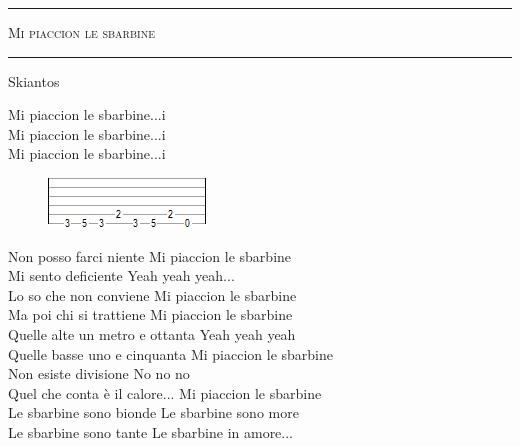 \documentclass[10pt, twoside, a4paper]{article}
\begin{document}
\begin{center}

	\hrule \vspace{0.2cm}
     	\textsc{\LARGE Mi piaccion le sbarbine}
	\vspace{0.2cm} \hrule \vspace{0.2cm}
      	{\large Skiantos}



\end{center}

Mi piaccion le sbarbine...i \\
Mi piaccion le sbarbine...i \\
Mi piaccion le sbarbine...i \\

\begin{figure}[ht!]
	\includegraphics{images/temp.jpg}
\end{figure}

Non posso farci niente			\hfill	{}Mi piaccion le sbarbine \\ 
Mi sento deficiente				\hfill	Yeah yeah yeah... \\
Lo so che non conviene			\hfill	Mi piaccion le sbarbine \\
Ma poi chi si trattiene			\hfill	Mi piaccion le sbarbine \\

Quelle alte un metro e ottanta	\hfill	Yeah yeah yeah \\
Quelle basse uno e cinquanta		\hfill	Mi piaccion le sbarbine \\
Non esiste divisione				\hfill	No no no \\
Quel che conta è il calore...		\hfill	Mi piaccion le sbarbine \\

Le sbarbine sono bionde			\hfill	Le sbarbine sono more \\
Le sbarbine sono tante			\hfill	Le sbarbine in amore... \\
\end{document}
